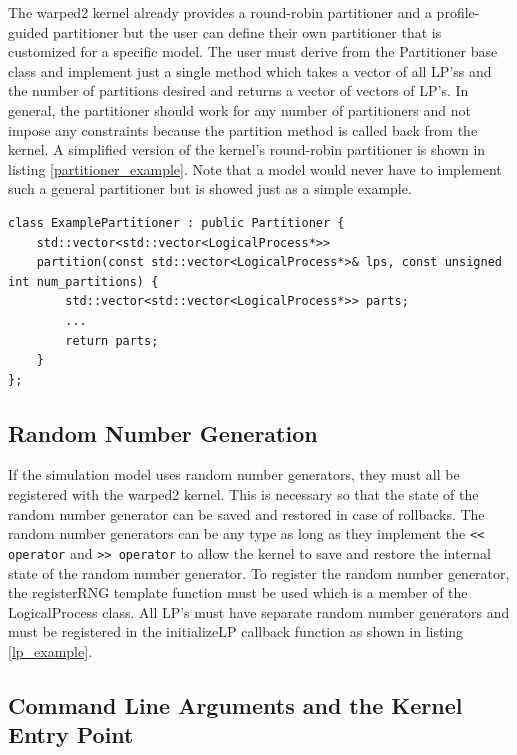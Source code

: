 \documentclass[11pt]{book}
\begin{document}
The warped2 kernel already provides a round-robin partitioner and a profile-guided partitioner
but the user can define their own partitioner that is customized for a specific model.
The user must derive from the Partitioner base class and implement just a single method
which takes a vector of all LP'ss and the number of partitions desired and returns a vector
of vectors of LP's. In general, the partitioner should work for any number of partitioners
and not impose any constraints because the partition method is called back from the kernel.
A simplified version of the kernel's round-robin partitioner is shown in listing
\ref{partitioner_example}. Note that a model would never have to implement such a general
partitioner but is showed just as a simple example.

\begin{lstlisting}[caption=Example \textsc{warped2} Partitioner Definition, label=partitioner_example, float]
class ExamplePartitioner : public Partitioner {
    std::vector<std::vector<LogicalProcess*>>
    partition(const std::vector<LogicalProcess*>& lps, const unsigned int num_partitions) {
        std::vector<std::vector<LogicalProcess*>> parts;
        ...
        return parts;
    }
};
\end{lstlisting}

\subsection{Random Number Generation}

If the simulation model uses random number generators, they must all be registered with the
warped2 kernel. This is necessary so that the state of the random number generator can be
saved and restored in case of rollbacks. The random number generators can be any type as
long as they implement the \texttt{<< operator} and \texttt{>> operator} to allow the kernel
to save and restore the internal state of the random number generator. To register the
random number generator, the registerRNG template function must be used which is a member
of the LogicalProcess class. All LP's must have separate random number generators and must
be registered in the initializeLP callback function as shown in listing \ref{lp_example}.

\subsection{Command Line Arguments and the Kernel Entry Point}
\end{document}
